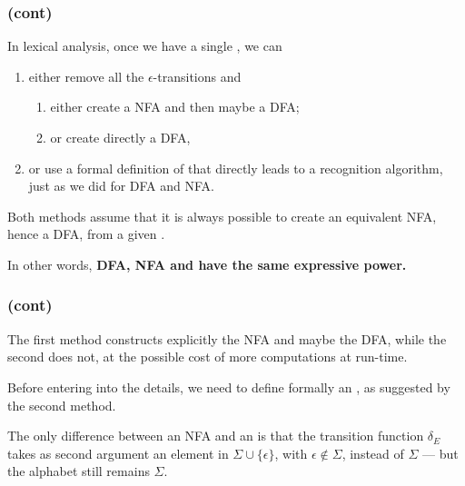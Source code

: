 %
\begin{frame}
\frametitle{\eNFA (cont)}

In lexical analysis, once we have a single \eNFA, we can
\begin{enumerate}

  \item either remove all the \(\epsilon\)-transitions and
  \begin{enumerate}
    \item either create a NFA and then maybe a DFA;

    \item or create directly a DFA,

  \end{enumerate}

  \item or use a formal definition of \eNFA that directly leads to a
  recognition algorithm, just as we did for DFA and NFA.

\end{enumerate}
Both methods assume that it is always possible to create an equivalent
NFA, hence a DFA, from a given \eNFA.

\bigskip

In other words, \textbf{DFA, NFA and \eNFA have the same expressive
  power.}

\end{frame}

%
\begin{frame}
\frametitle{\eNFA (cont)}

The first method constructs explicitly the NFA and maybe the DFA,
while the second does not, at the possible cost of more computations
at run-time.

\bigskip

Before entering into the details, we need to define formally an
\eNFA, as suggested by the second method.

\bigskip

The only difference between an NFA and an \eNFA is that the
transition function \(\delta_E\) takes as second argument an element
in \(\Sigma \cup \{\epsilon\}\), with \(\epsilon \not\in \Sigma\),
instead of \(\Sigma\) --- but the alphabet still remains \(\Sigma\).

\end{frame}

